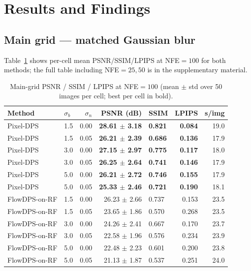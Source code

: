 \documentclass{article}
\begin{document}
\section{Results and Findings}\label{sec:results}

\subsection{Main grid — matched Gaussian blur}


Table~\ref{tab:main_nfe100} shows per-cell mean PSNR/SSIM/LPIPS at
NFE${=}100$ for both methods; the full table including NFE${=}25,50$
is in the supplementary material.

\begin{table}[h]
  \centering
  \caption{Main-grid PSNR / SSIM / LPIPS at NFE${=}100$ (mean $\pm$ std over 50
    images per cell; best per cell in bold).}
  \label{tab:main_nfe100}
  \begin{tabular}{llrrlrr}
    \toprule
    Method & $\sigma_b$ & $\sigma_n$ & PSNR (dB) & SSIM & LPIPS & s/img \\
    \midrule
    Pixel-DPS     & 1.5 & 0.00 & \textbf{28.61 $\pm$ 3.18} & \textbf{0.821} & \textbf{0.084} & 19.0 \\
    Pixel-DPS     & 1.5 & 0.05 & \textbf{26.21 $\pm$ 2.39} & \textbf{0.686} & \textbf{0.136} & 17.9 \\
    Pixel-DPS     & 3.0 & 0.00 & \textbf{27.15 $\pm$ 2.97} & \textbf{0.775} & \textbf{0.117} & 18.0 \\
    Pixel-DPS     & 3.0 & 0.05 & \textbf{26.25 $\pm$ 2.64} & \textbf{0.741} & \textbf{0.146} & 17.9 \\
    Pixel-DPS     & 5.0 & 0.00 & \textbf{26.21 $\pm$ 2.72} & \textbf{0.746} & \textbf{0.155} & 17.9 \\
    Pixel-DPS     & 5.0 & 0.05 & \textbf{25.33 $\pm$ 2.46} & \textbf{0.721} & \textbf{0.190} & 18.1 \\
    \midrule
    FlowDPS-on-RF & 1.5 & 0.00 & 26.23 $\pm$ 2.66 & 0.737 & 0.153 & 23.5 \\
    FlowDPS-on-RF & 1.5 & 0.05 & 23.65 $\pm$ 1.86 & 0.570 & 0.268 & 23.5 \\
    FlowDPS-on-RF & 3.0 & 0.00 & 24.26 $\pm$ 2.41 & 0.667 & 0.170 & 23.7 \\
    FlowDPS-on-RF & 3.0 & 0.05 & 22.58 $\pm$ 1.96 & 0.576 & 0.234 & 23.9 \\
    FlowDPS-on-RF & 5.0 & 0.00 & 22.48 $\pm$ 2.23 & 0.601 & 0.200 & 23.8 \\
    FlowDPS-on-RF & 5.0 & 0.05 & 21.13 $\pm$ 1.87 & 0.537 & 0.251 & 24.0 \\
    \bottomrule
  \end{tabular}
\end{table}
\end{document}
